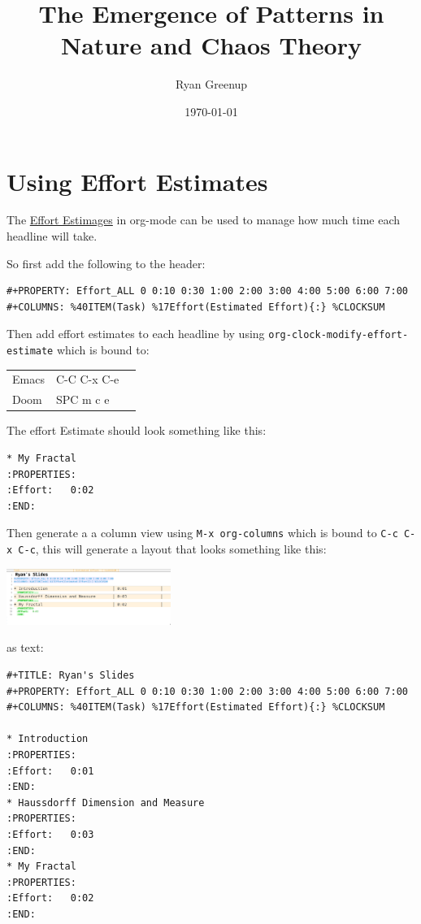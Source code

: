 \documentclass[11pt]{article}
\author{Ryan Greenup}
\date{\today}
\title{The Emergence of Patterns in Nature and Chaos Theory}
\begin{document}
\maketitle
\tableofcontents

\section{Using Effort Estimates}
\label{sec:org94230b3}
The \href{https://orgmode.org/manual/Effort-Estimates.html}{Effort Estimages} in org-mode can be used to manage how much time each headline will take.

So first add the following to the header:

\begin{verbatim}
#+PROPERTY: Effort_ALL 0 0:10 0:30 1:00 2:00 3:00 4:00 5:00 6:00 7:00
#+COLUMNS: %40ITEM(Task) %17Effort(Estimated Effort){:} %CLOCKSUM
\end{verbatim}

Then add effort estimates to each headline by using \texttt{org-clock-modify-effort-estimate} which is bound to:

\begin{center}
\begin{tabular}{lll}
Emacs & C-C C-x C-e & \\
Doom & SPC m c e & \\
\end{tabular}

\end{center}

The effort Estimate should look something like this:

\begin{verbatim}
* My Fractal
:PROPERTIES:
:Effort:   0:02
:END:
\end{verbatim}


Then generate a a column view using  \texttt{M-x org-columns} which is bound to \texttt{C-c C-x C-c}, this will generate a layout that looks something like this:

\begin{center}
\includegraphics[width=0.4\textwidth]{media/screenshot-of-org-mode-column-view.png}
\end{center}

as text:

\begin{verbatim}
#+TITLE: Ryan's Slides
#+PROPERTY: Effort_ALL 0 0:10 0:30 1:00 2:00 3:00 4:00 5:00 6:00 7:00
#+COLUMNS: %40ITEM(Task) %17Effort(Estimated Effort){:} %CLOCKSUM

* Introduction
:PROPERTIES:
:Effort:   0:01
:END:
* Haussdorff Dimension and Measure
:PROPERTIES:
:Effort:   0:03
:END:
* My Fractal
:PROPERTIES:
:Effort:   0:02
:END:
\end{verbatim}
\end{document}
